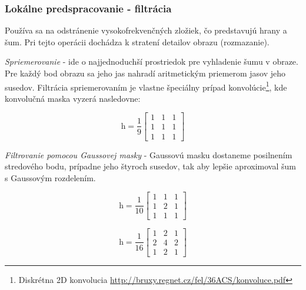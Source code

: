 \subsubsection{Lokálne predspracovanie - filtrácia}
Používa sa na odstránenie vysokofrekvenčných zložiek, čo predstavujú hrany a šum. Pri tejto operácii dochádza k stratení detailov obrazu (rozmazanie). \cite{Detekcia_a_rozpoznavanie_objektov}

\textit{Spriemerovanie} - ide o najjednoduchší prostriedok pre vyhladenie šumu v obraze. Pre každý bod obrazu sa jeho jas nahradí aritmetickým priemerom jasov jeho susedov. Filtrácia spriemerovaním je vlastne špeciálny prípad konvolúcie\footnote{Diskrétna 2D konvolucia \url{http://bruxy.regnet.cz/fel/36ACS/konvoluce.pdf}}, kde konvolučná maska vyzerá nasledovne: \cite{Detekcia_a_rozpoznavanie_objektov}

\begin{equation}
    \textit{h}=\frac{1}{9}\begin{bmatrix} 1 & 1 & 1 \\ 1 & 1 & 1 \\ 1 & 1 & 1  \end{bmatrix}
\end{equation}

\textit{Filtrovanie pomocou Gaussovej masky} - Gaussovú masku dostaneme posilnením stredového bodu, prípadne jeho štyroch susedov, tak aby lepšie aproximoval šum s Gaussovým rozdelením. \cite{Detekcia_a_rozpoznavanie_objektov}


\begin{figure}[H]
    \centering
    \begin{minipage}[b]{0.49\textwidth}
        \begin{equation}
            \textit{h}=\frac{1}{10}\begin{bmatrix} 1 & 1 & 1 \\ 1 & 2 & 1 \\ 1 & 1 & 1  \end{bmatrix}
        \end{equation}
    \end{minipage}
    \hfill
    \begin{minipage}[b]{0.49\textwidth}
        \begin{equation}
            \textit{h}=\frac{1}{16}\begin{bmatrix} 1 & 2 & 1 \\ 2 & 4 & 2 \\ 1 & 2 & 1  \end{bmatrix}
        \end{equation}
    \end{minipage}
\end{figure}


